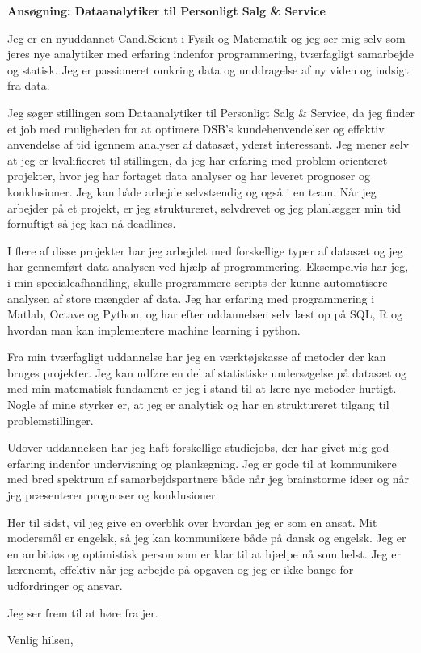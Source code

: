 \documentclass[12pt,a4paper]{letter}
\begin{document}
\begin{letter}{}
\opening{\textbf{Ansøgning: Dataanalytiker til Personligt Salg \& Service}} 

Jeg er en nyuddannet Cand.Scient i Fysik og Matematik og jeg ser mig selv som jeres nye analytiker med erfaring indenfor programmering, tværfagligt samarbejde og statisk. Jeg er passioneret omkring data og unddragelse af ny viden og indsigt fra data. 

Jeg søger stillingen som Dataanalytiker til Personligt Salg \& Service, da jeg finder et job med muligheden for at optimere DSB's kundehenvendelser og effektiv anvendelse af tid igennem analyser af datasæt, yderst interessant. Jeg mener selv at jeg er kvalificeret til stillingen, da jeg har erfaring med problem orienteret projekter, hvor jeg har fortaget data analyser og har leveret prognoser og konklusioner. Jeg kan både arbejde selvstændig og også i en team. Når jeg arbejder på et projekt, er jeg struktureret, selvdrevet og jeg planlægger min tid fornuftigt så jeg kan nå deadlines.      

I flere af disse projekter har jeg arbejdet med forskellige typer af datasæt og jeg har gennemført data analysen ved hjælp af programmering. Eksempelvis har jeg, i min specialeafhandling, skulle programmere scripts der kunne automatisere analysen af store mængder af data. Jeg har erfaring med programmering i Matlab, Octave og Python, og har efter uddannelsen selv læst op på SQL, R og hvordan man kan implementere machine learning i python. 

Fra min tværfagligt uddannelse har jeg en værktøjskasse af metoder der kan bruges projekter. Jeg kan udføre en del af statistiske undersøgelse på datasæt og med min matematisk fundament er jeg i stand til at lære nye metoder hurtigt. Nogle af mine styrker er, at jeg er analytisk og har en struktureret tilgang til problemstillinger. 
 
Udover uddannelsen har jeg haft forskellige studiejobs, der har givet mig god erfaring indenfor undervisning og planlægning. Jeg er gode til at kommunikere med bred spektrum af samarbejdspartnere både når jeg brainstorme ideer og når jeg præsenterer prognoser og konklusioner.

Her til sidst, vil jeg give en overblik over hvordan jeg er som en ansat. Mit modersmål er engelsk, så jeg kan kommunikere både på dansk og engelsk. Jeg er en ambitiøs og optimistisk person som er klar til at hjælpe nå som helst. Jeg er lærenemt, effektiv når jeg arbejde på opgaven og jeg er ikke bange for udfordringer og ansvar. 

Jeg ser frem til at høre fra jer.
\closing{Venlig hilsen,}

\end{letter}
\end{document}
